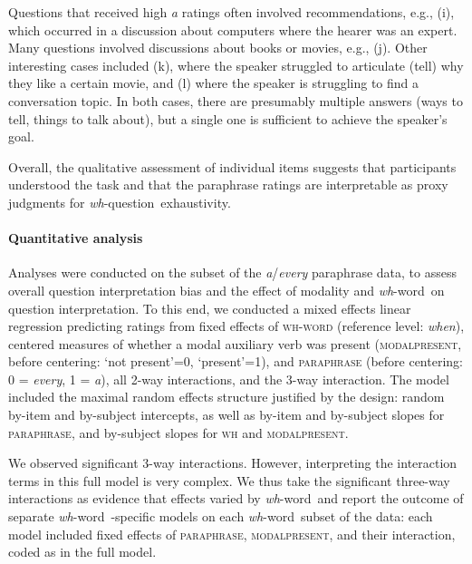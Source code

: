 \documentclass[12pt,letterpaper,table,svgnames,dvipsnames]{article}
\newcommand{\whq}{\emph{wh}-question~}
\newcommand{\whw}{\emph{wh}-word~}
\begin{document}
Questions that received high \emph{a} ratings often involved recommendations, e.g., (i), which occurred in a discussion about computers where the hearer was an expert. Many questions involved discussions about books or movies, e.g., (j). Other interesting cases included (k), where the speaker struggled to articulate (tell) why they like a certain movie, and (l) where the speaker is struggling to find a conversation topic. In both cases, there are presumably multiple answers (ways to tell, things to talk about), but a single one is sufficient to achieve the speaker's goal.

Overall, the qualitative assessment of individual items suggests that participants understood the task and that the paraphrase ratings are interpretable as proxy judgments for \whq exhaustivity.

\paragraph{Quantitative analysis}

Analyses were conducted on the subset of the \emph{a}/\emph{every} paraphrase data, to assess overall question interpretation bias and the effect of modality and \whw on question interpretation. To this end, we conducted a mixed effects linear regression predicting ratings from fixed effects of \textsc{wh-word} (reference level: \emph{when}), centered measures of whether a modal auxiliary verb was present (\textsc{modalpresent}, before centering: `not present'=0, `present'=1), and \textsc{paraphrase} (before centering: 0 = \emph{every}, 1 = \emph{a}), all 2-way interactions, and the 3-way interaction. The model included the maximal random effects structure justified by the design: random by-item and by-subject intercepts, as well as by-item and by-subject slopes for \textsc{paraphrase}, and by-subject slopes for \textsc{wh} and \textsc{modalpresent}. 

We observed significant 3-way interactions. However, interpreting the interaction terms in this full model is very complex. We thus take the significant three-way interactions as evidence that effects varied by \whw and report the outcome of separate \whw-specific models on each \whw subset of the data: each model included fixed effects of \textsc{paraphrase}, \textsc{modalpresent}, and their interaction, coded as in the full model. 
\end{document}

